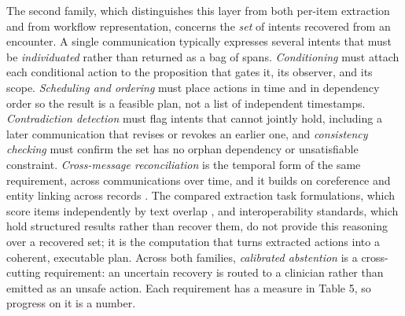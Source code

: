 The second family, which distinguishes this layer from both per-item extraction and from workflow representation, concerns the \emph{set} of intents recovered from an encounter. A single communication typically expresses several intents that must be \emph{individuated} rather than returned as a bag of spans. \emph{Conditioning} must attach each conditional action to the proposition that gates it, its observer, and its scope. \emph{Scheduling and ordering} must place actions in time and in dependency order so the result is a feasible plan, not a list of independent timestamps. \emph{Contradiction detection} must flag intents that cannot jointly hold, including a later communication that revises or revokes an earlier one, and \emph{consistency checking} must confirm the set has no orphan dependency or unsatisfiable constraint. \emph{Cross-message reconciliation} is the temporal form of the same requirement, across communications over time, and it builds on coreference and entity linking across records \cite{ref50}. The compared extraction task formulations, which score items independently by text overlap \cite{ref32}, and interoperability standards, which hold structured results rather than recover them, do not provide this reasoning over a recovered set; it is the computation that turns extracted actions into a coherent, executable plan. Across both families, \emph{calibrated abstention} is a cross-cutting requirement: an uncertain recovery is routed to a clinician rather than emitted as an unsafe action. Each requirement has a measure in Table 5, so progress on it is a number.

